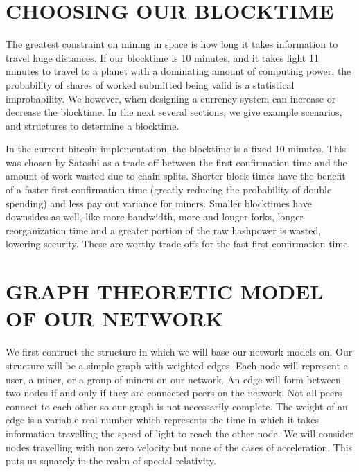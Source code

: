 \documentclass[conference]{IEEEtran}
\begin{document}
\section{CHOOSING OUR BLOCKTIME}
The greatest constraint on mining in space is how long it takes information to travel huge distances. If our blocktime is 10 minutes, and it takes light 11 minutes to travel to a planet with a dominating amount of computing power, the probability of shares of worked submitted being valid is a statistical improbability. We however, when designing a currency system can increase or decrease the blocktime. In the next several sections, we give example scenarios, and structures to determine a blocktime. 

In the current bitcoin implementation, the blocktime is a fixed 10 minutes. This was chosen by Satoshi as a trade-off between the first confirmation time and the amount of work wasted due to chain splits. Shorter block times have the benefit of a faster first confirmation time (greatly reducing the probability of double spending) and less pay out variance for miners. Smaller blocktimes have downsides as well, like more bandwidth, more and longer forks, longer reorganization time and a greater portion of the raw hashpower is wasted, lowering security. These are worthy trade-offs for the fast first confirmation time. 

\section{GRAPH THEORETIC MODEL OF OUR NETWORK}
We first contruct the structure in which we will base our network models on. Our structure will be a simple graph with weighted edges. Each node will represent a user, a miner, or a group of miners on our network. An edge will form between two nodes if and only if they are connected peers on the network. Not all peers connect to each other so our graph is not necessarily complete. The weight of an edge is a variable real number which represents the time in which it takes information travelling the speed of light to reach the other node. We will consider nodes travelling with non zero velocity but none of the cases of acceleration. This puts us squarely in the realm of special relativity. 
 
\end{document}
